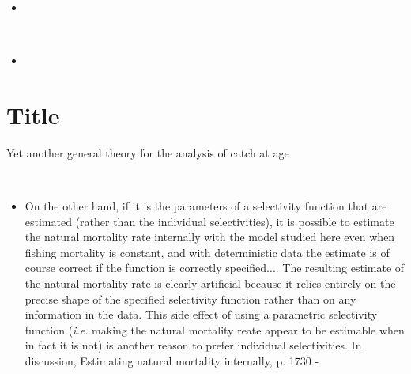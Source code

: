 \documentclass[11pt]{article}
\begin{document}
\begin{itemize}
\item
\end{itemize}

\\

\begin{itemize}
\item
\end{itemize}


\section{Title}
Yet another general theory for the analysis of catch at age


\\
\begin{itemize}
\item On the other hand, if it is the parameters of a selectivity function that are estimated (rather than the individual selectivities), it is possible to estimate the natural mortality rate internally with the model studied here even when fishing mortality is constant, and with deterministic data the estimate is of course correct if the function is correctly specified.... The resulting estimate of the natural mortality rate is clearly artificial because it relies entirely on the precise shape of the specified selectivity function rather than on any information in the data. This side effect of using a parametric selectivity function ({\it i.e.} making the natural mortality reate appear to be estimable when in fact it is not) is another reason to prefer individual selectivities. In discussion, Estimating natural mortality internally, p. 1730 - \citep{doi:10.1139}
\end{itemize}


\end{document}
